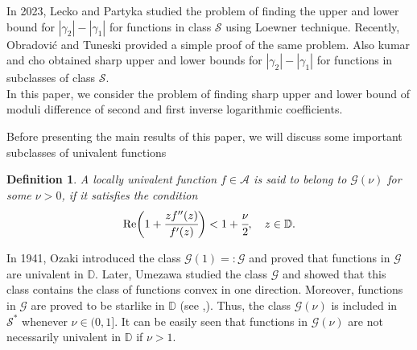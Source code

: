 \documentclass[a4paper,12pt]{amsart}
\newtheorem{definition}[theorem]{Definition}
\theoremstyle{definition}
\numberwithin{equation}{section}
\begin{document}
In 2023, Lecko and Partyka \cite{adamlog} studied the problem of finding the upper and lower bound for $|\gamma_2|-|\gamma_1|$ for functions in class $\mathcal{S}$ using  Loewner technique. Recently, Obradovi\'{c} and  Tuneski \cite{OTnew} provided a simple proof of the same problem. Also kumar and cho \cite{kumar2} obtained sharp upper and lower bounds for $|\gamma_2|-|\gamma_1|$ for functions in subclasses of class $\mathcal{S}$. \\[2mm]
\noindent  In this paper, we consider the problem of finding sharp upper and lower bound of moduli difference of second and first inverse logarithmic coefficients.

\noindent Before presenting the main results of this paper, we will discuss some important subclasses of univalent functions




\begin{definition}
A locally univalent function $f\in \mathcal{A}$ is said to belong to $\mathcal{G}(\nu)$ for some $\nu>0$, if it satisfies the condition
\begin{equation*}
{\rm Re}\bigg(1+\cfrac{zf''(z)}{f'(z)}\bigg)<1+\cfrac{\nu}{2}, \quad z\in \mathbb{D}.
\end{equation*}
\end{definition}

\noindent In 1941, Ozaki \cite{Ozaki41} introduced the class $\mathcal{G}(1)=:\mathcal{G}$ and proved that functions in $\mathcal{G}$ are univalent in $\mathbb{D}$. Later, Umezawa \cite{UME52} studied the class $\mathcal{G}$ and showed that this class contains the class of functions convex in one direction. Moreover, functions in $\mathcal{G}$ are proved to be starlike in $\mathbb{D}$ (see \cite{ponnusamy95},\cite{ponnusamy07}). Thus, the class $\mathcal{G}(\nu)$ is included in $\mathcal{S}^*$ whenever $\nu\in (0,1]$. It can be easily seen that functions in $\mathcal{G}(\nu)$ are not necessarily univalent in $\mathbb{D}$ if $\nu>1$. 
\end{document}
